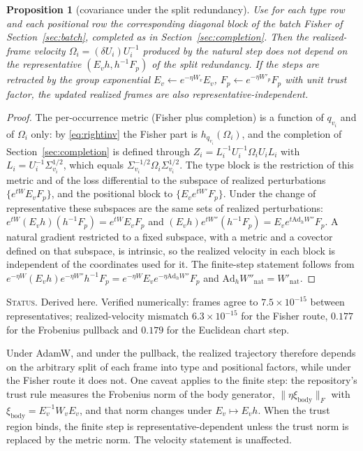 \documentclass[11pt]{article}
\newtheorem{proposition}[theorem]{Proposition}
\theoremstyle{definition}
\theoremstyle{remark}
\newcommand{\Ad}{\mathrm{Ad}}
\newcommand{\status}[1]{\par\smallskip\noindent\textsc{Status.} #1\par\smallskip}
\begin{document}
\begin{proposition}[covariance under the split redundancy]\label{prop:split}
Use for each type row and each positional row the corresponding diagonal block of the batch Fisher of Section~\ref{sec:batch}, completed as in Section~\ref{sec:completion}. Then the realized-frame velocity $\Omega_i=(\delta U_i)U_i^{-1}$ produced by the natural step does not depend on the representative $(E_vh,h^{-1}F_p)$ of the split redundancy. If the steps are retracted by the group exponential $E_v\leftarrow e^{-\eta W_v}E_v$, $F_p\leftarrow e^{-\eta W'_p}F_p$ with unit trust factor, the updated realized frames are also representative-independent.
\end{proposition}
\begin{proof}
The per-occurrence metric (Fisher plus completion) is a function of $q_{v_i}$ and of $\Omega_i$ only: by \eqref{eq:rightinv} the Fisher part is $h_{q_{v_i}}(\Omega_i)$, and the completion of Section~\ref{sec:completion} is defined through $Z_i=L_i^{-1}U_i^{-1}\Omega_iU_iL_i$ with $L_i=U_i^{-1}\Sigma_{v_i}^{1/2}$, which equals $\Sigma_{v_i}^{-1/2}\Omega_i\Sigma_{v_i}^{1/2}$. The type block is the restriction of this metric and of the loss differential to the subspace of realized perturbations $\{e^{tW}E_vF_p\}$, and the positional block to $\{E_ve^{tW'}F_p\}$. Under the change of representative these subspaces are the same sets of realized perturbations: $e^{tW}(E_vh)(h^{-1}F_p)=e^{tW}E_vF_p$ and $(E_vh)e^{tW''}(h^{-1}F_p)=E_ve^{t\Ad_hW''}F_p$. A natural gradient restricted to a fixed subspace, with a metric and a covector defined on that subspace, is intrinsic, so the realized velocity in each block is independent of the coordinates used for it. The finite-step statement follows from $e^{-\eta W}(E_vh)e^{-\eta W''}h^{-1}F_p=e^{-\eta W}E_ve^{-\eta\Ad_hW''}F_p$ and $\Ad_hW''_{\mathrm{nat}}=W'_{\mathrm{nat}}$.
\end{proof}
\status{Derived here. Verified numerically: frames agree to $7.5\times10^{-15}$ between representatives; realized-velocity mismatch $6.3\times10^{-15}$ for the Fisher route, $0.177$ for the Frobenius pullback and $0.179$ for the Euclidean chart step.}

Under AdamW, and under the pullback, the realized trajectory therefore depends on the arbitrary split of each frame into type and positional factors, while under the Fisher route it does not. One caveat applies to the finite step: the repository's trust rule measures the Frobenius norm of the body generator, $\|\eta\xi_{\mathrm{body}}\|_F$ with $\xi_{\mathrm{body}}=E_v^{-1}W_vE_v$, and that norm changes under $E_v\mapsto E_vh$. When the trust region binds, the finite step is representative-dependent unless the trust norm is replaced by the metric norm. The velocity statement is unaffected.
\end{document}

